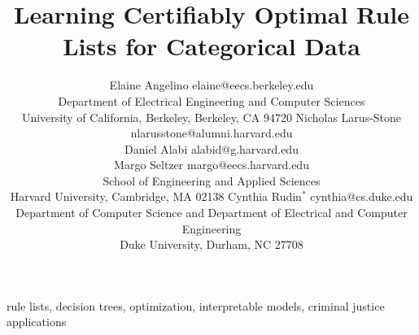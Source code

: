 \documentclass[twoside,11pt]{article}
\begin{document}
\title{Learning Certifiably Optimal Rule Lists for Categorical Data}

\author{\name Elaine Angelino \email elaine@eecs.berkeley.edu \\
        \addr Department of Electrical Engineering and Computer Sciences\\
        University of California, Berkeley,
        Berkeley, CA 94720
        \AND
        \name Nicholas Larus-Stone \email nlarusstone@alumni.harvard.edu \\
        \name Daniel Alabi \email alabid@g.harvard.edu \\
        \name Margo Seltzer \email margo@eecs.harvard.edu \\
        \addr School of Engineering and Applied Sciences\\
        Harvard University,
        Cambridge, MA 02138
        \AND
        \name Cynthia Rudin$^*$ \email cynthia@cs.duke.edu \\
        \addr Department of Computer Science and
        Department of Electrical and Computer Engineering\\
        Duke University,
        Durham, NC 27708}


\maketitle

\begin{abstract}%

\end{abstract}

\begin{keywords}
    rule lists, decision trees, optimization, interpretable models, criminal justice applications
\end{keywords}














\end{document}
